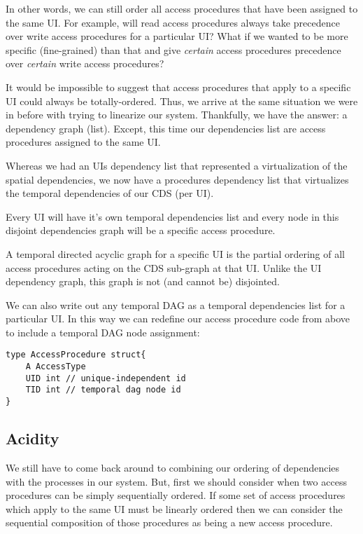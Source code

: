 In other words, we can still order all access procedures that have been assigned to the same UI. For example, will read access procedures always take precedence over write access procedures for a particular UI? What if we wanted to be more specific (fine-grained) than that and give \textit{certain} access procedures precedence over \textit{certain} write access procedures?

It would be impossible to suggest that access procedures that apply to a specific UI could always be totally-ordered. Thus, we arrive at the same situation we were in before with trying to linearize our system. Thankfully, we have the answer: a dependency graph (list). Except, this time our dependencies list are access procedures assigned to the same UI.

Whereas we had an UIs dependency list that represented a virtualization of the spatial dependencies, we now have a procedures dependency list that virtualizes the temporal dependencies of our CDS (per UI). 

Every UI will have it's own temporal dependencies list and every node in this disjoint dependencies graph will be a specific access procedure.

\begin{con-def}
	\label{temporal-dag}
	A temporal directed acyclic graph for a specific UI is the partial ordering of all access procedures acting on the CDS sub-graph at that UI. Unlike the UI dependency graph, this graph is not (and cannot be) disjointed.
\end{con-def}

We can also write out any temporal DAG as a temporal dependencies list for a particular UI. In this way we can redefine our access procedure code from above to include a temporal DAG node assignment:

\begin{verbatim}
type AccessProcedure struct{
	A AccessType
	UID int // unique-independent id
	TID int // temporal dag node id
}
\end{verbatim}

\subsection{Acidity}

We still have to come back around to combining our ordering of dependencies with the processes in our system. But, first we should consider when two access procedures can be simply sequentially ordered. If some set of access procedures which apply to the same UI must be linearly ordered then we can consider the sequential composition of those procedures as being a new access procedure.


